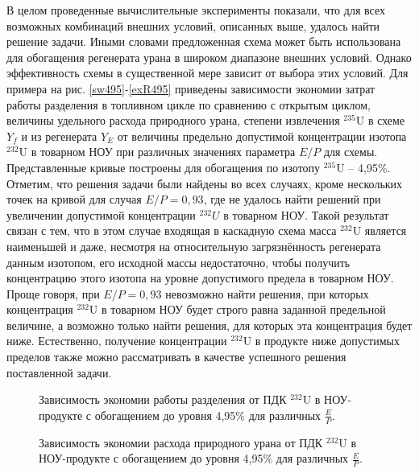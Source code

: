 {В целом проведенные вычислительные эксперименты показали, что для всех возможных комбинаций внешних условий, описанных выше, удалось найти решение задачи. Иными словами предложенная схема может быть использована для обогащения регенерата урана в широком диапазоне внешних условий. Однако эффективность схемы в существенной мере зависит от выбора этих условий. Для примера на рис. \ref{sw495}-\ref{exR495} приведены зависимости экономии затрат работы разделения в топливном цикле по сравнению с открытым циклом, величины удельного расхода природного урана, степени извлечения $^{235}$U в схеме $Y_f$ и из регенерата $Y_{E}$ от величины предельно допустимой концентрации изотопа $^{232}$U в товарном НОУ при различных значениях параметра $E/P$ для схемы. Представленные кривые построены для обогащения по изотопу $^{235}$U -- 4,95\%. Отметим, что решения задачи были найдены во всех случаях, кроме нескольких точек на кривой для случая $E/P=0,93$, где не удалось найти решений при увеличении допустимой концентрации $^{232}U$ в товарном НОУ. Такой результат связан с тем, что в этом случае входящая в каскадную схема масса $^{232}$U является наименьшей и даже, несмотря на относительную загрязнённость регенерата данным изотопом, его исходной массы недостаточно, чтобы получить концентрацию этого изотопа на  уровне допустимого предела в товарном НОУ. Проще говоря, при $E/P=0,93$ невозможно найти решения, при которых концентрация $^{232}$U в товарном НОУ будет строго равна заданной предельной величине, а возможно только найти решения, для которых эта концентрация будет ниже. Естественно, получение концентрации $^{232}$U в продукте ниже допустимых пределов также можно рассматривать в качестве успешного решения поставленной задачи.

\begin{figure}[ht]
    \centering
    \begin{minipage}{.5\textwidth}
      \centering
      
\caption{{Зависимость экономии работы разделения от ПДК $^{232}$U в НОУ-продукте с обогащением до уровня 4,95\% для различных $\frac{E}{P}$.{\label{sw495}}}}
    \end{minipage}%
    \begin{minipage}{.5\textwidth}
      \centering
      
    \caption{{Зависимость экономии расхода природного урана от ПДК $^{232}$U в НОУ-продукте с обогащением до уровня 4,95\% для различных $\frac{E}{P}$.{\label{F0R495}}}}
\end{minipage}
\end{figure}


}
